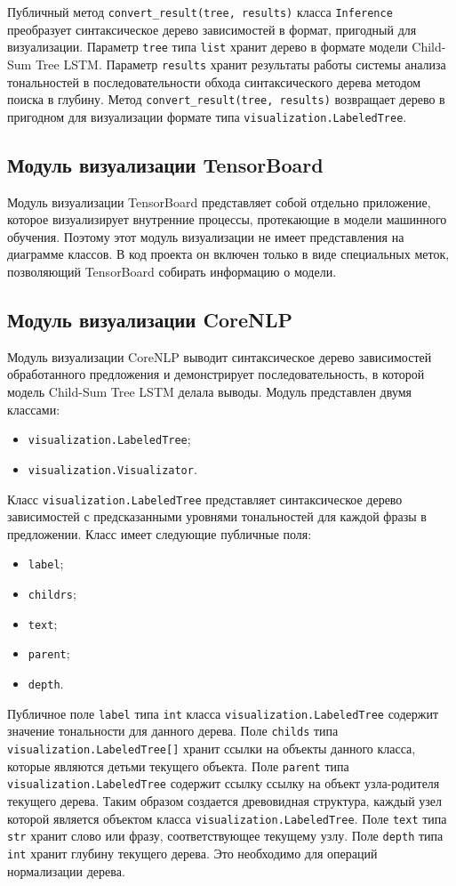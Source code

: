 Публичный метод \texttt{convert\_result(tree, results)} класса \texttt{In\-ference} преобразует синтаксическое дерево зависимостей в формат, пригодный для визуализации. Параметр \texttt{tree} типа \texttt{list} хранит дерево в формате модели Child-Sum Tree LSTM\@. Параметр \texttt{results} хранит результаты работы системы анализа тональностей в последовательности обхода синтаксического дерева методом поиска в глубину. Метод \texttt{convert\_result(tree, results)} возвращает дерево в пригодном для визуализации формате типа \texttt{visualization.La\-beledTree}.

\subsection{Модуль визуализации TensorBoard}
Модуль визуализации TensorBoard представляет собой отдельно приложение, которое визуализирует внутренние процессы, протекающие в модели машинного обучения. Поэтому этот модуль визуализации не имеет представления на диаграмме классов. В код проекта он включен только в виде специальных меток, позволяющий TensorBoard собирать информацию о модели.

\subsection{Модуль визуализации CoreNLP}
Модуль визуализации CoreNLP выводит синтаксическое дерево зависимостей обработанного предложения и демонстрирует последовательность, в которой модель Child-Sum Tree LSTM делала выводы. Модуль представлен двумя классами:
\begin{itemize}
\item \texttt{visualization.LabeledTree};
\item \texttt{visualization.Visualizator}.
\end{itemize}

Класс \texttt{visualization.LabeledTree} представляет синтаксическое дерево зависимостей с предсказанными уровнями тональностей для каждой фразы в предложении. Класс имеет следующие публичные поля:
\begin{itemize}
\item \texttt{label};
\item \texttt{childrs};
\item \texttt{text};
\item \texttt{parent};
\item \texttt{depth}.
\end{itemize}

Публичное поле \texttt{label} типа \texttt{int} класса \texttt{visualization.Label\-edTree} содержит значение тональности для данного дерева. Поле \texttt{childs} типа \texttt{vi\-sualization.LabeledTree[]} хранит ссылки на объекты данного класса, которые являются детьми текущего объекта. Поле \texttt{parent} типа \texttt{visualizati\-on.LabeledTree} содержит ссылку ссылку на объект узла-родителя текущего дерева. Таким образом создается древовидная структура, каждый узел которой является объектом класса \texttt{visualization.Label\-edTree}. Поле \texttt{text} типа \texttt{str} хранит слово или фразу, соответствующее текущему узлу. Поле \texttt{depth} типа \texttt{int} хранит глубину текущего дерева. Это необходимо для операций нормализации дерева.

